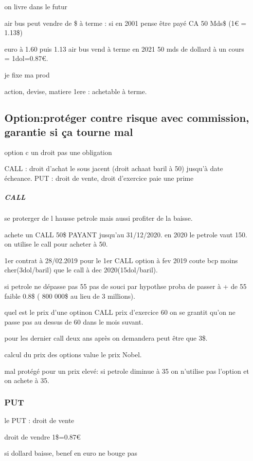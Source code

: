 \documentclass[a4paper,12pt]{article}
\begin{document}
on livre dans le futur


air bus peut vendre de \$ à terme :
si en 2001 pense être payé CA 50 Mds\$  (1€ = 1.13\$)

euro à 1.60 puis 1.13 
air bus vend à terme en  2021 50 mds de dollard à un cours = 1dol=0.87€.

je fixe ma prod 

action, devise, matiere 1ere : achetable à terme.

  
\subsection{ Option:protéger contre risque avec commission, garantie si ça tourne mal}
  
 option c un droit pas une obligation
 
 CALL : droit d'achat le sous jacent (droit achaat baril à 50) jusqu'à date écheance.
 PUT : droit de vente, 
 droit d'exercice
 paie une prime
 
 \subparagraph{CALL}
 
 se proterger de l hausse petrole mais aussi profiter de la baisse.
 
 achete un CALL 50\$   PAYANT  jusqu'au 31/12/2020.
 en 2020 le petrole vaut 150. on utilise le call pour acheter à 50.
 
 1er contrat à 28/02.2019 pour le 1er CALL option à fev 2019 coute bcp moins cher(3dol/baril) que le call à dec 2020(15dol/baril).
 
 si petrole ne dépasse pas 55 pas de souci par hypothse proba de passer à + de 55 faible 0.8\$ ( 800 000\$ au lieu de 3 millions).
 
 quel est le prix d'une optinon CALL prix d'exercice 60 on se grantit qu'on ne passe pas au dessus de 60 dans le mois suvant.
 
 pour les dernier call deux ans après  on demandera peut être que 3\$.
 
 
 calcul du prix des options value le prix Nobel.
 
 mal protégé pour un prix elevé: si petrole diminue à 35 on n'utilise pas l'option et on achete à 35.
 
 
 \subsubsection{PUT}
 le PUT : droit de vente
 
 
 droit de vendre 1\$=0.87€
 
 si dollard baisse, benef en euro ne bouge pas
 
\end{document}
